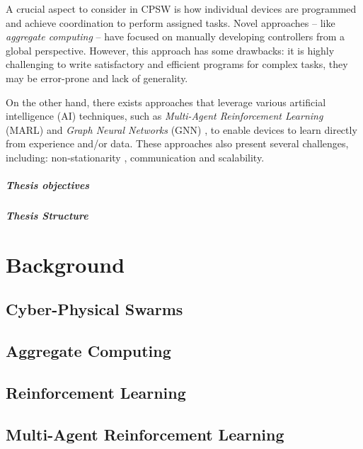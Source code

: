 \documentclass[12pt,a4paper,openright,twoside]{book}
\begin{document}
A crucial aspect to consider in CPSW is how individual devices are programmed and achieve coordination to perform assigned tasks. 
Novel approaches -- like \emph{aggregate computing} \cite{viroli2018field} -- have focused on manually developing
controllers from a global perspective. However, this approach has some drawbacks: it is highly challenging to write satisfactory 
and efficient programs for complex tasks, they may be error-prone and lack of generality.

On the other hand, there exists approaches that leverage various artificial intelligence (AI) techniques, 
such as \emph{Multi-Agent Reinforcement Learning} (MARL) \cite{busoniu2008comprehensive} and \emph{Graph Neural Networks} (GNN) \cite{wu2020comprehensive}, 
to enable devices to learn directly from experience and/or data. These approaches also present several challenges, including: non-stationarity 
\cite{hernandez2017survey}, communication and scalability.

%
\paragraph{Thesis objectives}
%
\paragraph{Thesis Structure} 


\chapter{Background}
\label{chap:background}

\section{Cyber-Physical Swarms}
%
\section{Aggregate Computing}
%
\section{Reinforcement Learning}
%
\section{Multi-Agent Reinforcement Learning}
\end{document}

